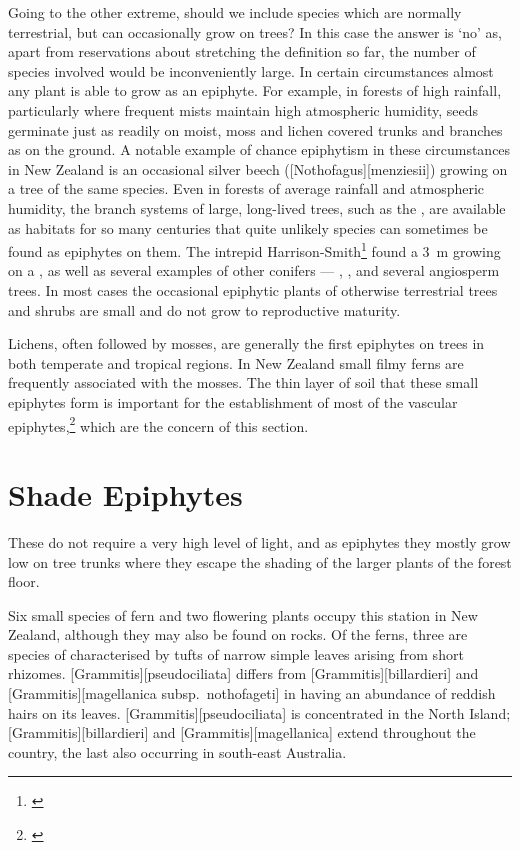 Going to the other extreme, should we include species which are normally terrestrial, but can occasionally grow on trees? In this case the answer is `no' as, apart from reservations about stretching the definition so far, the number of species involved would be inconveniently large.
In certain circumstances almost any plant is able to grow as an epiphyte.
For example, in forests of high rainfall, particularly where frequent mists maintain high atmospheric humidity, seeds germinate just as readily on moist, moss and lichen covered trunks and branches as on the ground.
A notable example of chance epiphytism in these circumstances in New Zealand is an occasional silver beech ([Nothofagus][menziesii]) growing on a tree of the same species.
Even in forests of average rainfall and atmospheric humidity, the branch systems of large, long-lived trees, such as the , are available as habitats for so many centuries that quite unlikely species can sometimes be found as epiphytes on them.
The intrepid Harrison-Smith\footnote{\cite{harrisonsmith1938kauri}} found a \SI{3}{\metre}  growing on a , as well as several examples of other conifers --- , ,  and several angiosperm trees.
In most cases the occasional epiphytic plants of otherwise terrestrial trees and shrubs are small and do not grow to reproductive maturity.

Lichens, often followed by mosses, are generally the first epiphytes on trees in both temperate and tropical regions.
In New Zealand small filmy ferns are frequently associated with the mosses.
The thin layer of soil that these small epiphytes form is important for the establishment of most of the vascular epiphytes,\footnote{\cite{oliver1930new}} which are the concern of this section.

\section{Shade Epiphytes}

These do not require a very high level of light, and as epiphytes they mostly grow low on tree trunks where they escape the shading of the larger plants of the forest floor.

Six small species of fern and two flowering plants occupy this station in New Zealand, although they may also be found on rocks.
Of the ferns, three are species of  characterised by tufts of narrow simple leaves arising from short rhizomes. [Grammitis][pseudociliata] differs from [Grammitis][billardieri] and [Grammitis][magellanica subsp.\ nothofageti] in having an abundance of reddish hairs on its leaves. [Grammitis][pseudociliata] is concentrated in the North Island; [Grammitis][billardieri] and [Grammitis][magellanica] extend throughout the country, the last also occurring in south-east Australia.

